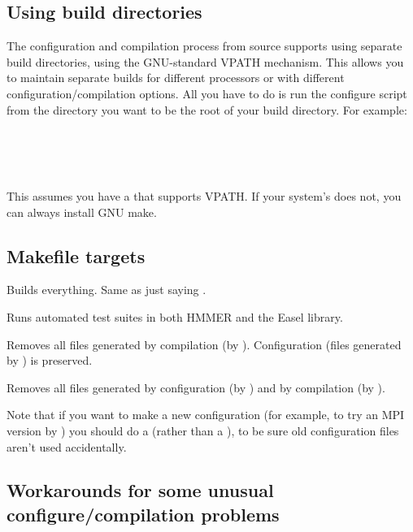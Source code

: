 \subsection{Using build directories}

The configuration and compilation process from source supports using
separate build directories, using the GNU-standard VPATH
mechanism. This allows you to maintain separate builds for different
processors or with different configuration/compilation options. All
you have to do is run the configure script from the directory you want
to be the root of your build directory.  For example:

\\
\\
\\

This assumes you have a  that supports VPATH. If your
system's  does not, you can always install GNU make.

\subsection{Makefile targets}

\begin{sreitems}{}
\item[\emprog{all}]
  Builds everything. Same as just saying .

\item[\emprog{check}]
  Runs automated test suites in both HMMER and the Easel library.

\item[\emprog{clean}]
  Removes all files generated by compilation (by
  ). Configuration (files generated by
  ) is preserved.

\item[\emprog{distclean}]
  Removes all files generated by configuration (by )
  and by compilation (by ). 

  Note that if you want to make a new configuration (for example, to
  try an MPI version by ) you
  should do a  (rather than a ), to be sure old configuration files aren't used
  accidentally.
\end{sreitems}


\subsection{Workarounds for some unusual configure/compilation problems}

